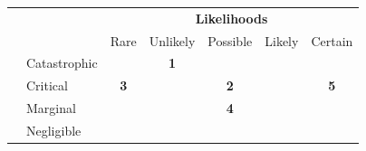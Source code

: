 \documentclass{article}
\begin{document}
\begin{table}[H]
\centering
\begin{tabular}{clcllll}
\multicolumn{1}{l}{}                                    &                                    & \multicolumn{5}{c}{\textbf{Likelihoods}}                                                                                                                                                                                                                                                       \\ \cline{2-7} 
\multicolumn{1}{l|}{}                                   & \multicolumn{1}{l|}{}              & \multicolumn{1}{l|}{Rare}                               & \multicolumn{1}{l|}{Unlikely}                           & \multicolumn{1}{l|}{Possible}                           & \multicolumn{1}{l|}{Likely}                            & \multicolumn{1}{l|}{Certain}                            \\ \cline{2-7} 
\multicolumn{1}{c|}{}                                   & \multicolumn{1}{l|}{Catastrophic}  & \multicolumn{1}{c|}{\cellcolor[HTML]{F8FF00}\textbf{}}  & \multicolumn{1}{c|}{\cellcolor[HTML]{FFC702}\textbf{1}} & \multicolumn{1}{c|}{\cellcolor[HTML]{FE0000}\textbf{}}  & \multicolumn{1}{c|}{\cellcolor[HTML]{FE0000}\textbf{}} & \multicolumn{1}{c|}{\cellcolor[HTML]{FE0000}\textbf{}}  \\ \cline{2-7} 
\multicolumn{1}{c|}{}                                   & \multicolumn{1}{l|}{Critical}      & \multicolumn{1}{c|}{\cellcolor[HTML]{F8FF00}\textbf{3}} & \multicolumn{1}{c|}{\cellcolor[HTML]{FFC702}\textbf{}}  & \multicolumn{1}{c|}{\cellcolor[HTML]{FFC702}\textbf{2}} & \multicolumn{1}{c|}{\cellcolor[HTML]{FE0000}\textbf{}} & \multicolumn{1}{c|}{\cellcolor[HTML]{FE0000}\textbf{5}} \\ \cline{2-7} 
\multicolumn{1}{c|}{}                                   & \multicolumn{1}{l|}{Marginal}      & \multicolumn{1}{c|}{\cellcolor[HTML]{32CB00}\textbf{}}  & \multicolumn{1}{c|}{\cellcolor[HTML]{F8FF00}\textbf{}}  & \multicolumn{1}{c|}{\cellcolor[HTML]{FFC702}\textbf{4}} & \multicolumn{1}{c|}{\cellcolor[HTML]{FFC702}\textbf{}} & \multicolumn{1}{c|}{\cellcolor[HTML]{FE0000}\textbf{}}  \\ \cline{2-7} 
\multicolumn{1}{c|}{}                                   & \multicolumn{1}{l|}{Negligible}    & \multicolumn{1}{l|}{\cellcolor[HTML]{32CB00}}           & \multicolumn{1}{l|}{\cellcolor[HTML]{F8FF00}}           & \multicolumn{1}{l|}{\cellcolor[HTML]{F8FF00}}           & \multicolumn{1}{l|}{\cellcolor[HTML]{FFC702}}          & \multicolumn{1}{l|}{\cellcolor[HTML]{FFC702}}           \\ \cline{2-7} 

\end{tabular}
\end{table}
\end{document}
